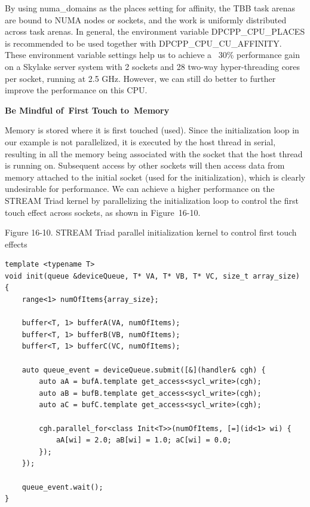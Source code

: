 By using numa\_domains as the places setting for affinity, the TBB task arenas are bound to NUMA nodes or sockets, and the work is uniformly distributed across task arenas. In general, the environment variable DPCPP\_CPU\_PLACES is recommended to be used together with DPCPP\_CPU\_CU\_AFFINITY. These environment variable settings help us to achieve a ~30\% performance gain on a Skylake server system with 2 sockets and 28 two-way hyper-threading cores per socket, running at 2.5 GHz. However, we can still do better to further improve the performance on this CPU.\par

\hspace*{\fill} \par %
\textbf{Be Mindful of First Touch to Memory}

Memory is stored where it is first touched (used). Since the initialization loop in our example is not parallelized, it is executed by the host thread in serial, resulting in all the memory being associated with the socket that the host thread is running on. Subsequent access by other sockets will then access data from memory attached to the initial socket (used for the initialization), which is clearly undesirable for performance. We can achieve a higher performance on the STREAM Triad kernel by parallelizing the initialization loop to control the first touch effect across sockets, as shown in Figure 16-10.\par

\hspace*{\fill} \par %
Figure 16-10. STREAM Triad parallel initialization kernel to control first touch effects
\begin{lstlisting}[caption={}]
template <typename T>
void init(queue &deviceQueue, T* VA, T* VB, T* VC, size_t array_size) {
	range<1> numOfItems{array_size};
	
	buffer<T, 1> bufferA(VA, numOfItems);
	buffer<T, 1> bufferB(VB, numOfItems);
	buffer<T, 1> bufferC(VC, numOfItems);
	
	auto queue_event = deviceQueue.submit([&](handler& cgh) {
		auto aA = bufA.template get_access<sycl_write>(cgh);
		auto aB = bufB.template get_access<sycl_write>(cgh);
		auto aC = bufC.template get_access<sycl_write>(cgh);
		
		cgh.parallel_for<class Init<T>>(numOfItems, [=](id<1> wi) {
			aA[wi] = 2.0; aB[wi] = 1.0; aC[wi] = 0.0;
		});
	});

	queue_event.wait();
}
\end{lstlisting}

